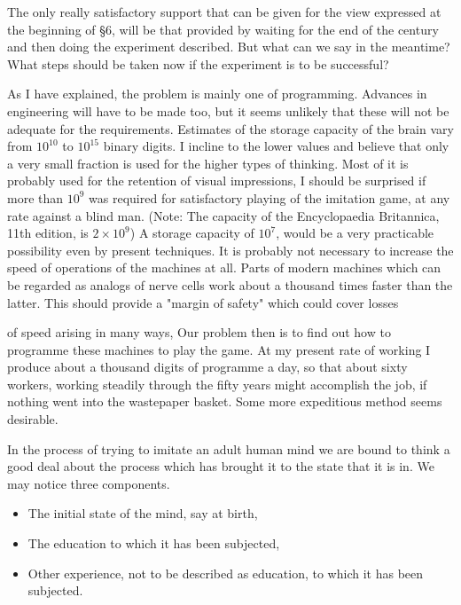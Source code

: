 \documentclass{article}
\begin{document}
The only really satisfactory support that can be given for the view expressed at the beginning of §6, will be that provided by waiting for the end of the century and then doing the experiment described. But what can we say in the meantime? What steps should be taken now if the experiment is to be successful?

As I have explained, the problem is mainly one of programming. Advances in engineering will have to be made too, but it seems unlikely that these will not be adequate for the requirements. Estimates of the storage capacity of the brain vary from $10^{10}$ to $10^{15}$ binary digits. I incline to the lower values and believe that only a very small fraction is used for the higher types of thinking. Most of it is probably used for the retention of visual impressions, I should be surprised if more than $10^9$ was required for satisfactory playing of the imitation game, at any rate against a blind man. (Note: The capacity of the Encyclopaedia Britannica, 11th edition, is $2 \times 10^9$) A storage capacity of $10^7$, would be a very practicable possibility even by present techniques. It is probably not necessary to increase the speed of operations of the machines at all. Parts of modern machines which can be regarded as analogs of nerve cells work about a thousand times faster than the latter. This should provide a "margin of safety" which could cover losses

of speed arising in many ways, Our problem then is to find out how to programme these machines to play the game. At my present rate of working I produce about a thousand digits of programme a day, so that about sixty workers, working steadily through the fifty years might accomplish the job, if nothing went into the wastepaper basket. Some more expeditious method seems desirable.

In the process of trying to imitate an adult human mind we are bound to think a good deal about the process which has brought it to the state that it is in. We may notice three components.


\begin{itemize}
\item The initial state of the mind, say at birth,

\item The education to which it has been subjected,

\item Other experience, not to be described as education, to which it has been subjected.\end{itemize}
\end{document}
